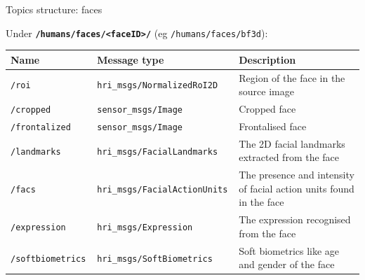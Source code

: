 \documentclass[xcolor=table,aspectratio=169]{beamer}
\begin{document}
\begin{frame}{Topics structure: faces}

    Under \textbf{\texttt{/humans/faces/<faceID>/}} (eg \texttt{/humans/faces/bf3d}):

    \scriptsize
    \begin{tabular}{@{}p{2.5cm}p{4.5cm}p{6cm}@{}}
        \toprule
\textbf{Name} & \textbf{Message type}         & \textbf{Description}                                                \\ \midrule
        \texttt{/roi       }   & \texttt{hri\_msgs/NormalizedRoI2D} & Region of the face in the source image                              \\
        \texttt{/cropped       }   & \texttt{sensor\_msgs/Image} & Cropped face                              \\
        \texttt{/frontalized       }   & \texttt{sensor\_msgs/Image} & Frontalised face                              \\
        \texttt{/landmarks }   & \texttt{hri\_msgs/FacialLandmarks    } & The 2D facial landmarks extracted from the face                     \\
        \texttt{/facs      }   & \texttt{hri\_msgs/FacialActionUnits  } & The presence and intensity of facial action units found in the face \\
        \texttt{/expression}   & \texttt{hri\_msgs/Expression         } & The expression recognised from the face           \\
        \texttt{/softbiometrics      } & \texttt{hri\_msgs/SoftBiometrics }  &   Soft biometrics like age and gender of the face                                       \\  \bottomrule               
\end{tabular}
    
\end{frame}
\end{document}
